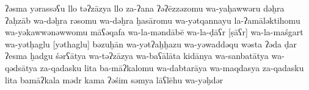 \begin{transliteration}
    ʔəsma yərassəʕu llo təʔzāzya
    llo za-ʔana ʔəʔēzzəzomu wa-yaḥawwəru dəḫra ʔaḥzāb wa-dəḫra
    rə\kw{}somu wa-dəḫra ḫasāromu wa-yətqan\-nayu la-ʔamāləktihomu
    wa-yəkawwənəwwomu māʕəqafa wa-la-məndābē wa-la-ḍāʕr [ṣāʕr] wa-la-maśgart
    wa-yətḥaglu [yəthaglu] bəzuḫān wa-yətʔaḫḫazu wa-yəwaddəqu wəsta
    ʔəda ḍar ʔesma ḫadgu śərʕātya wa-təʔzāzya wa-baʕālāta
    kidānya wa-sanbatātya wa-qədsātya za-qadasku lita ba-māʔkalomu
    wa-dabtarāya wa-maqdasya za-qadasku lita bamāʔkala
    mədr kama ʔəśim səmya lāʕlēhu wa-yəḫdər

\end{transliteration}
